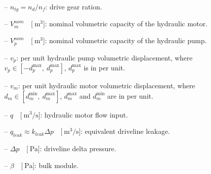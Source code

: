 \documentclass[11pt,a4paper,oneside]{book}
\numberwithin{equation}{section}
\theoremstyle{it}
\theoremstyle{definition}
\begin{document}
\begin{itemize}
		\item[--] $n_{tg}=n_{d}/n_{f}$: drive gear ration.
		\item[--] $V_m^{nom}\quad\Big[\SI{}{\cubic\meter}\Big]$: nominal volumetric capacity of the hydraulic motor.
		\item[--] $V_p^{nom}\quad\Big[\SI{}{\cubic\meter}\Big]$: nominal volumetric capacity of the hydraulic pump.
		\item[--] $v_p$: per unit hydraulic pump volumetric displacement, where $v_p   \in [-d_p^\text{max},\ d_p^\text{max}]$, $d_p^\text{max}$ is in per unit.
		\item[--] $v_m$: per unit hydraulic motor volumetric displacement, where $d_m\in [d_m^\text{min},\ d_m^\text{max}]$, $d_m^\text{max}$ and $d_m^\text{min}$ are in per unit.
		\item[--] $q\quad\Big[\SI{}{\cubic\meter\per\second}\Big]$: hydraulic motor flow input.		
		\item[--] $q_{leak} \approx k_{leak}\Delta p \quad\Big[\SI{}{\cubic\meter\per\second}\Big]$: equivalent driveline leakage.
		\item[--] $\Delta p\quad\Big[\SI{}{\pascal}\Big] $: driveline delta pressure.
		\item[--] $\beta\quad\Big[\SI{}{\pascal}\Big] $: bulk module.
	\end{itemize}
\end{document}
